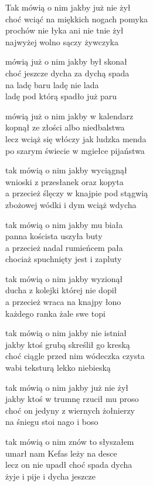 \begin{text}
    Tak mówią o nim jakby już nie żył\\
    choć wciąć na miękkich nogach pomyka\\
    prochów nie łyka ani nie tnie żył\\
    najwyżej wolno sączy żywczyka

    mówią już o nim jakby był skonał\\
    choć jeszcze dycha za dychą spada\\
    na ladę baru ladę nie lada\\
    ladę pod którą spadło już paru

    mówią już o nim jakby w kalendarz\\
    kopnął ze złości albo niedbalstwa\\
    lecz wciąż się włóczy jak ludzka menda\\
    po szarym świecie w mgiełce pijaństwa

    tak mówią o nim jakby wyciągnął\\
    wnioski z przesłanek oraz kopyta\\
    a przecież ślęczy w knajpie pod stągwią\\
    zbożowej wódki i dym wciąż wdycha

    tak mówią o nim jakby mu biała\\
    panna koścista uszyła buty\\
    a przecież nadal rumieńcem pała\\
    chociaż spuchnięty jest i zapluty

    tak mówią o nim jakby wyzionął\\
    ducha z kolejki której nie dopił\\
    a przecież wraca na knajpy łono\\
    każdego ranka żale swe topi

    tak mówią o nim jakby nie istniał\\
    jakby ktoś grubą skreślił go kreską\\
    choć ciągle przed nim wódeczka czysta\\
    wabi teksturą lekko niebieską

    tak mówią o nim jakby już nie żył\\
    jakby ktoś w trumnę rzucił mu proso\\
    choć on jedyny z wiernych żołnierzy\\
    na śniegu stoi nago i boso

    tak mówią o nim znów to słyszałem\\
    umarł nam Kefas leży na desce\\
    lecz on nie upadł choć spada dycha\\
    żyje i pije i dycha jeszcze
\end{text}
\begin{chord}

\end{chord}